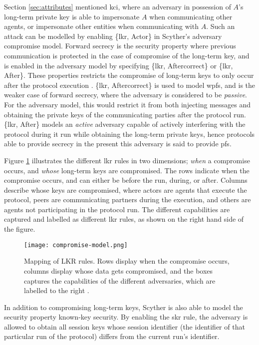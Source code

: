 Section \ref{sec:attributes} mentioned \gls{kci}, where an adversary in possession of $A$'s long-term private key is able to impersonate $A$ when communicating other agents, or impersonate other entities when communicating with $A$. Such an attack can be modelled by enabling \{\gls{lkr}, Actor\} in Scyther's adversary compromise model. Forward secrecy is the security property where previous communication is protected in the case of compromise of the long-term key, and is enabled in the adversary model by specifying \{\gls{lkr}, Aftercorrect\} or \{\gls{lkr}, After\}. These properties restricts the compromise of long-term keys to only occur after the protocol execution \cite{basin2010modeling}. \{\gls{lkr}, Aftercorrect\} is used to model \gls{wpfs}, and is the weaker case of forward secrecy, where the adversary is considered to be \emph{passive}. For the adversary model, this would restrict it from both injecting messages and obtaining the private keys of the communicating parties after the protocol run.  \{\gls{lkr}, After\} models an \emph{active} adversary capable of actively interfering with the protocol during it run while obtaining the long-term private keys, hence protocols able to provide secrecy in the present this adversary is said to provide \gls{pfs}. 



Figure \ref{fig:compromise-model} illustrates the different \gls{lkr} rules in two dimensions; \emph{when} a compromise occurs, and \emph{whose} long-term keys are compromised. The rows indicate when the compromise occurs, and can either be before the run, during, or after. Columns describe whose keys are compromised, where actors are agents that execute the protocol, peers are communicating partners during the execution, and others are agents not participating in the protocol run. The different capabilities are captured and labelled as different \gls{lkr} rules, as shown on the right hand side of the figure. 

\begin{figure}
	\centering
	\texttt{[image: compromise-model.png]}
	\caption{Mapping of LKR rules. Rows display when the compromise occurs, columns display whose data gets compromised, and the boxes captures the capabilities of the different adversaries, which are labelled to the right \cite{basin2010modeling}.}
	\label{fig:compromise-model}
\end{figure}


In addition to compromising long-term keys, Scyther is also able to model the security property known-key security. By enabling the \gls{skr} rule, the adversary is allowed to obtain all session keys whose session identifier (the identifier of that particular run of the protocol) differs from the current run's identifier.


